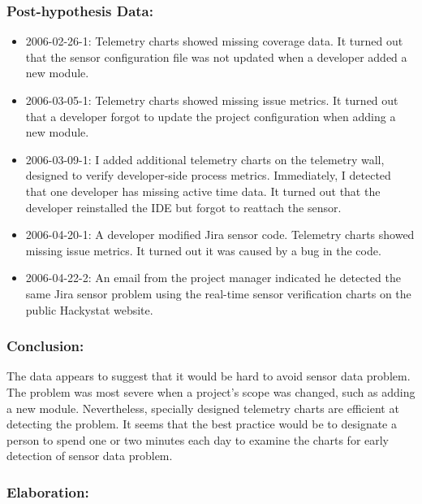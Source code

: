 \subsubsection{Post-hypothesis Data:}
\begin{itemize}
  \setlength{\itemsep}{0pt}
  \setlength{\parskip}{0pt}
  \item 2006-02-26-1: Telemetry charts showed missing coverage data. It turned out that the sensor configuration file was not updated when a developer added a new module.
  \item 2006-03-05-1: Telemetry charts showed missing issue metrics. It turned out that a developer forgot to update the project configuration when adding a new module.
  \item 2006-03-09-1: I added additional telemetry charts on the telemetry wall, designed to verify developer-side process metrics. Immediately, I detected that one developer has missing active time data. It turned out that the developer reinstalled the IDE but forgot to reattach the sensor.
  \item 2006-04-20-1: A developer modified Jira sensor code. Telemetry charts showed missing issue metrics. It turned out it was caused by a bug in the code.
  \item 2006-04-22-2: An email from the project manager indicated he detected the same Jira sensor problem using the real-time sensor verification charts on the public Hackystat website.    
\end{itemize}

\subsubsection{Conclusion:}

The data appears to suggest that it would be hard to avoid sensor data problem. The problem was most severe when a project's scope was changed, such as adding a new module. Nevertheless, specially designed telemetry charts are efficient at detecting the problem. It seems that the best practice would be to designate a person to spend one or two minutes each day to examine the charts for early detection of sensor data problem. 


\subsubsection{Elaboration:}

